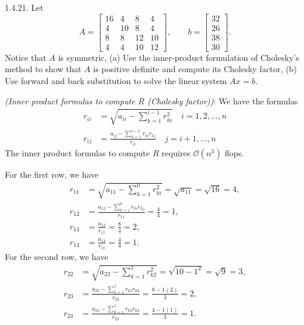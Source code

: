 \documentclass{report}
\begin{document}
    \pagebreak \bigbreak \noindent 
    \begin{mdframed}
        1.4.21.  Let
        \[
            A =
            \begin{bmatrix}
                16 & 4 & 8 & 4 \\
                4 & 10 & 8 & 4 \\
                8 & 8 & 12 & 10 \\
                4 & 4 & 10 & 12
            \end{bmatrix},
            \qquad
            b =
            \begin{bmatrix}
                32 \\
                26 \\
                38 \\
                30
            \end{bmatrix}.
        \]
        Notice that $A$ is symmetric, (a) Use the inner-product formulation of Cholesky's method to show that $A$ is positive definite and compute its Cholesky factor, (b) Use forward and back substitution to solve the linear system $Ax =b$. 
    \end{mdframed}
    \bigbreak \noindent 
    \begin{remark}
    \textit{(Inner product formulas to compute $R$ (Cholesky factor))}: We have the formulas
        \begin{align*}
            r_{ii} &= \sqrt{a_{ii} - \sum_{k=1}^{i-1}r_{ki}^{2}} \quad i = 1,2,...,n \\
            r_{ij} &= \frac{a_{ij} - \sum_{k=1}^{i-1}r_{ki}r_{kj}}{r_{ii}} \quad j = i+1,...,n
        \end{align*}
        \bigbreak \noindent 
        The inner product formulas to compute $R$ requires $\mathcal{O}(n^{3})$ flops.
    \end{remark}
    \bigbreak \noindent 
    For the first row, we have
    \begin{align*}
        r_{11} &= \sqrt{a_{11} - \sum_{k=1}^{0}r^{2}_{ki}} = \sqrt{a_{11}} = \sqrt{16} = 4, \\
        r_{12} &= \frac{a_{12} - \sum_{k=1}^{0}r_{ki}r_{kj}}{r_{11}} = \frac{4}{4} = 1, \\
        r_{13} &= \frac{a_{13}}{r_{11}} = \frac{8}{4} = 2, \\
        r_{14} &= \frac{a_{14}}{r_{11}} = \frac{4}{4} = 1
    .\end{align*}
    For the second row, we have
    \begin{align*}
        r_{22} &= \sqrt{a_{22} - \sum_{k=1}^{1}r_{k2}^{2}} = \sqrt{10 - 1^{2}} = \sqrt{9} = 3, \\
        r_{23} &= \frac{a_{23} - \sum_{k=1}^{1}r_{k2}r_{k3}}{r_{22}} = \frac{8-1(2)}{3} = 2, \\
        r_{24} &= \frac{a_{24} - \sum_{k=1}^{1}r_{k2}r_{k4}}{r_{22}} = \frac{4 - 1(1)}{3} = 1
    .\end{align*}
\end{document}
